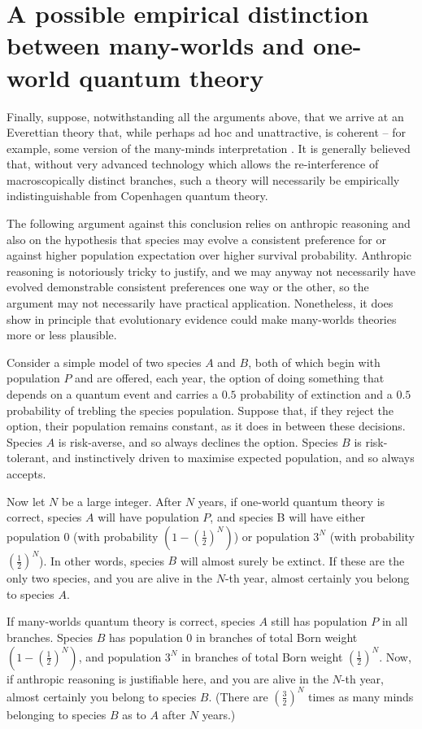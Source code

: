 \documentclass[aps,
pra,epsfig,12pt,nofootinbib]{revtex4}
\begin{document}
\section{A possible empirical distinction between many-worlds and one-world
quantum theory}

Finally, suppose, notwithstanding all the arguments above, 
that we arrive at an Everettian theory that, while perhaps 
ad hoc and unattractive, is coherent -- for example, some version of 
the many-minds interpretation \cite{almanyminds}.  
It is generally believed that, without very advanced technology which
allows the re-interference of macroscopically distinct branches, 
such a theory will necessarily be empirically indistinguishable from Copenhagen 
quantum theory.  

The following argument against this conclusion relies on anthropic 
reasoning and also on the hypothesis that species may evolve a  
consistent preference for or against higher population expectation over higher 
survival probability.  Anthropic reasoning is notoriously 
tricky to justify, and we may anyway not necessarily have evolved 
demonstrable consistent preferences one way or the other, so 
the argument may not necessarily have practical application.   
Nonetheless, it does
show in principle that evolutionary evidence could make many-worlds 
theories more or less plausible. 

Consider a simple model of two species $A$ and $B$, both of which begin
with population $P$ and are
offered, each year, the option of doing something that depends on a quantum
event and carries a $0.5$ probability of extinction and a $0.5$ probability 
of trebling the species population.  Suppose that, if they reject
the option, their 
population remains constant,
as it does in between these decisions.  Species $A$ is risk-averse, and so
always declines the option.   Species $B$ is risk-tolerant, and 
instinctively driven to maximise expected population, and so always
accepts.  

Now let $N$ be a large integer.  
After $N$ years, if one-world quantum theory is correct, species $A$ 
will have population $P$, and species B will have either population
$0$ (with probability $ ( 1 - ( \frac{1}{2} )^N )$) or population
$3^N$ (with probability $ ( \frac{1}{2} )^N$).   In other words, species
$B$ will almost surely be extinct.   If these are the only two species,
and you are alive in the $N$-th year, almost certainly you belong to 
species $A$.   

If many-worlds quantum theory is correct, species $A$ still has 
population $P$ in all branches.   Species $B$ has population $0$
in branches of total Born weight $ ( 1 - ( \frac{1}{2} )^N )$, and 
population $3^N$ in branches of total Born weight $ ( \frac{1}{2} )^N$. 
Now, if anthropic reasoning is justifiable here, and you are alive in 
the $N$-th year, almost certainly you belong to species $B$.
(There are $( \frac{3}{2} )^N$ times as many minds belonging to species
$B$ as to $A$ after $N$ years.)  
\end{document}
